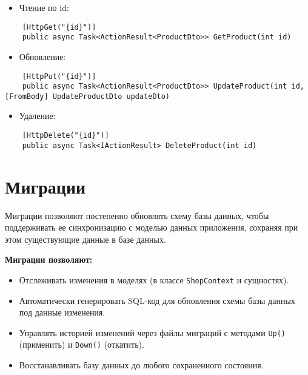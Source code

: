 \documentclass[a4paper,12pt]{report}
\begin{document}
\begin{itemize}
    \item Чтение по id:
\end{itemize}

\begin{verbatim}
    [HttpGet("{id}")]
    public async Task<ActionResult<ProductDto>> GetProduct(int id)   
\end{verbatim}

\begin{itemize}
    \item Обновление:
\end{itemize}

\begin{verbatim}
    [HttpPut("{id}")]
    public async Task<ActionResult<ProductDto>> UpdateProduct(int id, [FromBody] UpdateProductDto updateDto)  
\end{verbatim}

\begin{itemize}
    \item Удаление:
\end{itemize}
    
\begin{verbatim}
    [HttpDelete("{id}")]
    public async Task<IActionResult> DeleteProduct(int id) 
\end{verbatim}
    
\section{Миграции}

Миграции позволяют постепенно обновлять схему базы данных, чтобы поддерживать ее синхронизацию 
с моделью данных приложения, сохраняя при этом существующие данные в базе данных.\cite{migration}

\textbf{Миграции позволяют:}
\begin{itemize}
    \item
        Отслеживать изменения в моделях (в классе \texttt{ShopContext} и сущностях).
    \item
        Автоматически генерировать \acs{SQL}-код для обновления схемы базы данных под данные изменения.
    \item
        Управлять историей изменений через файлы миграций с методами \texttt{Up()} (применить) и \texttt{Down()} (откатить).
    \item
        Восстанавливать базу данных до любого сохраненного состояния.
\end{itemize}
\end{document}
